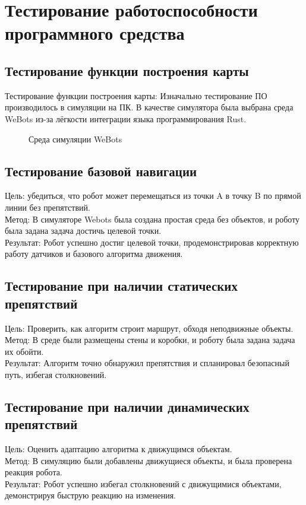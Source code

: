 \section{Тестирование работоспособности программного средства}

\subsection{Тестирование функции построения карты}
Тестирование функции построения карты:
Изначально тестирование ПО производилось в симуляции на ПК. В качестве симулятора была выбрана среда WeBots
из-за лёгкости интеграции языка программирования Rust.


\begin{figure}[H]
\centering
\caption{Среда симуляции WeBots}
\label{fig:components}
\end{figure}


\subsection{Тестирование базовой навигации}
Цель: убедиться, что робот может перемещаться из точки A в точку B по прямой линии без препятствий. \\ {Метод}: В симуляторе Webots была создана простая среда без объектов, и роботу была задана задача достичь целевой точки. \\
{Результат}: Робот успешно достиг целевой точки, продемонстрировав корректную работу датчиков и базового алгоритма движения.

\subsection{Тестирование при наличии статических препятствий}
Цель: Проверить, как алгоритм строит маршрут, обходя неподвижные объекты. \\
{Метод}: В среде были размещены стены и коробки, и роботу была задана задача их обойти. \\
{Результат}: Алгоритм точно обнаружил препятствия и спланировал безопасный путь, избегая столкновений.

\subsection{Тестирование при наличии динамических препятствий}
Цель: Оценить адаптацию алгоритма к движущимся объектам. \\
Метод: В симуляцию были добавлены движущиеся объекты, и была проверена реакция робота. \\
Результат: Робот успешно избегал столкновений с движущимися объектами, демонстрируя быструю реакцию на изменения.

